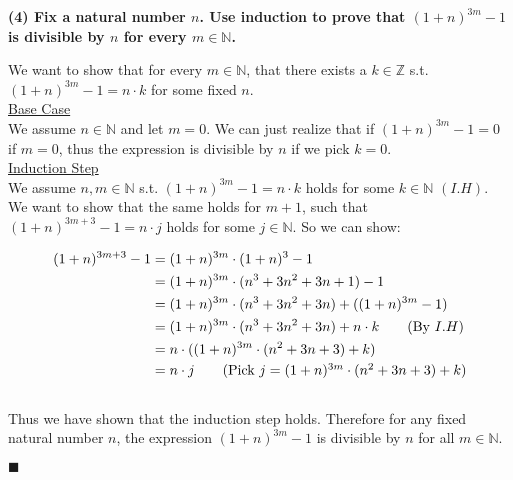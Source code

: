 \documentclass[20pt]{article}
\begin{document}
\noindent
\textbf{(4) Fix a natural number $n$. Use induction to prove that $(1 + n)^{3m}-1$ is divisible by $n$ for every $m \in \mathbb{N}$.}\\
\begin{text}
    We want to show that for every $m \in \mathbb{N}$, that there exists a $k \in \mathbb{Z}$ s.t. $(1 + n)^{3m}-1 = n \cdot k$ for some fixed $n$.\\
    
    \noindent
    \underline{Base Case}\\
    We assume $n \in \mathbb{N}$ and let $m = 0$. We can just realize that if $(1 + n)^{3m}-1 = 0$ if $m = 0$, thus the expression is divisible by $n$ if we pick $k = 0$.\\
    
    \noindent
    \underline{Induction Step}\\
    We assume $n,m \in \mathbb{N}$ s.t. $(1 + n)^{3m}-1 = n \cdot k$ holds for some $k \in \mathbb{N}$ $(I.H)$. We want to show that the same holds for $m + 1$, such that $(1 + n)^{3m + 3}-1 = n \cdot j$ holds for some $j \in \mathbb{N}$. So we can show:
    
    \begin{align}
        (1 + n)^{3m + 3}-1 &= (1 + n)^{3m}\cdot (1 + n)^{3}-1\nonumber\\
        &= (1 + n)^{3m} \cdot (n^3 + 3n^2 + 3n + 1) - 1\nonumber\\
        &= (1 + n)^{3m} \cdot (n^3 + 3n^2 + 3n) + ((1 + n)^{3m} - 1)\nonumber\\
        &= (1 + n)^{3m} \cdot (n^3 + 3n^2 + 3n) + n \cdot k \tag{By $I.H$}\nonumber\\
        &= n \cdot ((1 + n)^{3m} \cdot (n^2 + 3n + 3) + k)\nonumber\\
        &= n \cdot j \tag{Pick $j = (1 + n)^{3m} \cdot (n^2 + 3n + 3) + k$}
    \end{align}\\
    
    \noindent
    Thus we have shown that the induction step holds. Therefore for any fixed natural number $n$, the expression $(1 + n)^{3m}-1$ is divisible by $n$ for all $m \in \mathbb{N}$.
    
    \hfill $\blacksquare$
\end{text}\\

\newpage
\end{document}
